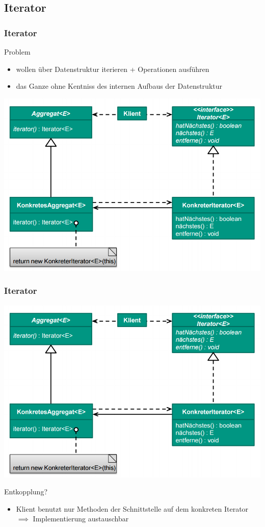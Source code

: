 \documentclass[18pt]{beamer}
\begin{document}
	\subsection{Iterator}
	\begin{frame}
		\frametitle{Iterator}
		\begin{block}{Problem}
			\begin{itemize}
				\item wollen über Datenstruktur iterieren + Operationen ausführen \pause
				\item das Ganze ohne Kentniss des internen Aufbaus der Datenstruktur 
			\end{itemize}
		\end{block}
		\pause
		\centering
		\includegraphics[scale=0.35]{./pics/tut3/iter.png}
	\end{frame}

	\begin{frame}
		\frametitle{Iterator}
		\centering
		\includegraphics[scale=0.35]{./pics/tut3/iter.png}
		\begin{block}{Entkopplung?}
			\begin{itemize}
				\pause 
				\item Klient benutzt nur Methoden der Schnittstelle auf dem konkreten Iterator \linebreak $\implies$ Implementierung austauschbar
			\end{itemize}
		\end{block}
	\end{frame}
	
\end{document}
